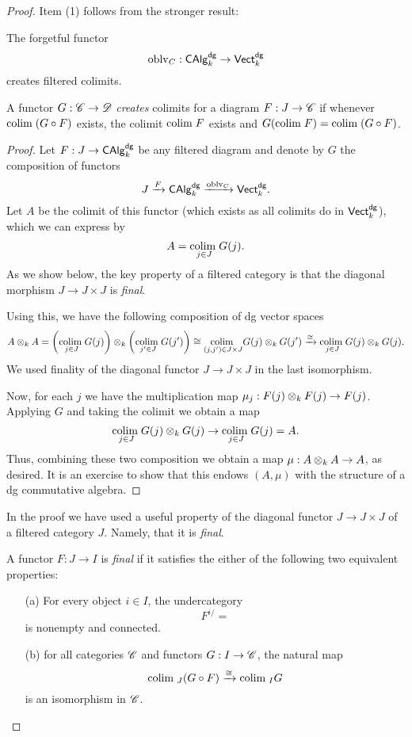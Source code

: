 \documentclass[11pt]{amsart}
\def\colim{{\rm colim}\;}
\begin{document}
\begin{proof}
Item (1) follows from the stronger result:

\begin{lem}
The forgetful functor 
\[
{\rm oblv}_C : {\sf CAlg}^{\sf dg}_k \to {\sf Vect}^{\sf dg}_k
\]
creates filtered colimits.
\end{lem}

\begin{rmk}
A functor $G : \mathscr C \to \mathscr D$ {\em creates} colimits for a diagram $F : J \to \mathscr C$ if whenever $\colim (G \circ F)$ exists, the colimit $\colim F$ exists and $G(\colim F) = \colim (G \circ F)$.
\end{rmk}

\begin{proof}
Let $F : J \to {\sf CAlg}^{\sf dg}_k$ be any filtered diagram and denote by $G$ the composition of functors
\[
J \xrightarrow{F} {\sf CAlg}^{\sf dg}_k \xrightarrow{{\rm oblv}_C} {\sf Vect}^{\sf dg}_k .
\]
Let $A$ be the colimit of this functor (which exists as all colimits do in ${\sf Vect}^{\sf dg}_k$), which we can express by
\[
A = \underset{j \in J}{\colim} G(j) .
\] 
As we show below, the key property of a filtered category is that the diagonal morphism $J \to J \times J$ is {\em final}. 

Using this, we have the following composition of dg vector spaces
\[
A \tensor_k A = \left(\underset{j \in J}{\colim} G(j)\right) \tensor_k \left(\underset{j' \in J}{\colim} G(j')\right) \cong \underset{(j,j') \in J\times J}{\colim} G(j) \tensor_k G(j') \xto{\cong} \underset{j \in J}{\colim} G(j) \tensor_k G(j) .
\]
We used finality of the diagonal functor $J \to J \times J$ in the last isomorphism. 

Now, for each $j$ we have the multiplication map $\mu_j : F(j) \otimes_k F(j) \to F(j)$.
Applying $G$ and taking the colimit we obtain a map
\[
\underset{j \in J}{\colim} G(j) \tensor_k G(j) \to \underset{j \in J}{\colim} G(j) = A .
\]
Thus, combining these two composition we obtain a map $\mu : A \otimes_k A \to A$, as desired. 
It is an exercise to show that this endows $(A, \mu)$ with the structure of a dg commutative algebra. 
\end{proof}

In the proof we have used a useful property of the diagonal functor $J \to J \times J$ of a filtered category $J$. 
Namely, that it is {\em final}. 

\begin{dfn}
A functor $F : J \to I$ is {\em final} if it satisfies the either of the following two equivalent properties:
\begin{itemize}
\item[(a)] 
For every object $i \in I$, the undercategory 
\[
F^{i /} =  
\]
is nonempty and connected. 
\item[(b)] for all categories $\mathscr C$ and functors $G : I \to \mathscr C$, the natural map
\[
\colim_{J} (G \circ F) \xto{\cong} \colim_{I} G
\]
is an isomorphism in $\mathscr C$. 
\end{itemize}
\end{dfn}


\end{proof}
\end{document}
